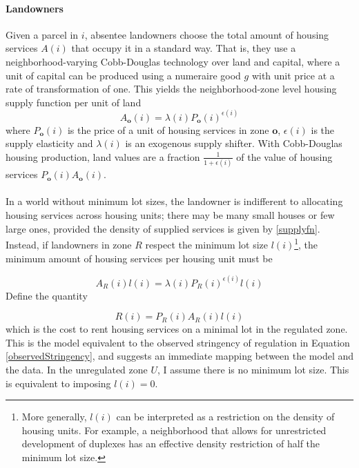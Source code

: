 \documentclass[12pt]{article}
\begin{document}
	\paragraph*{Landowners}  Given a parcel in $i$, absentee landowners choose the total amount of housing services $A(i)$ that occupy it in a standard way. That is, they use a neighborhood-varying Cobb-Douglas technology over land and capital, where a unit of capital can be produced using a numeraire good $g$ with unit price at a rate of transformation of one. This yields the neighborhood-zone level housing supply function per unit of land
	\begin{equation}\label{supplyfn}
		A_{\boldsymbol{o}}(i) = \lambda(i)P_{\boldsymbol{o}}(i)^{\epsilon(i)}
	\end{equation}
	where $P_{\boldsymbol{o}}(i)$ is the price of a unit of housing services in zone $\boldsymbol{o}$, $\epsilon(i)$ is the supply elasticity and $\lambda(i)$ is an exogenous supply shifter. With Cobb-Douglas housing production, land values are a fraction $\frac{1}{1 + \epsilon(i)}$ of the value of housing services $P_{\boldsymbol{o}}(i)A_{\boldsymbol{o}}(i)$.
	
	\paragraph*{}
	 In a world without minimum lot sizes, the landowner is indifferent to allocating housing services across housing units; there may be many small houses or few large ones, provided the density of supplied services is given by \eqref{supplyfn}. Instead, if landowners in zone $R$ respect the minimum lot size $l(i)$\footnote{More generally, $l(i)$ can be interpreted as a restriction on the density of housing units. For example, a neighborhood that allows for unrestricted development of duplexes has an effective density restriction of half the minimum lot size.}, the minimum amount of housing services per housing unit must be

	\begin{equation}\label{minstructure}
		A_{R}(i)l(i) = \lambda(i)P_{R}(i)^{\epsilon(i)}l(i)
	\end{equation}
	Define the quantity 
	
	\begin{equation}\label{stringency}
		R(i) = P_{R}(i)A_{R}(i)l(i)
	\end{equation}
	which is the cost to rent housing services on a minimal lot in the regulated zone. This is the model equivalent to the observed stringency of regulation in Equation \eqref{observedStringency}, and suggests an immediate mapping between the model and the data. In the unregulated zone $U$, I assume there is no minimum lot size. This is equivalent to imposing $l(i) = 0$. 
	
\end{document}
